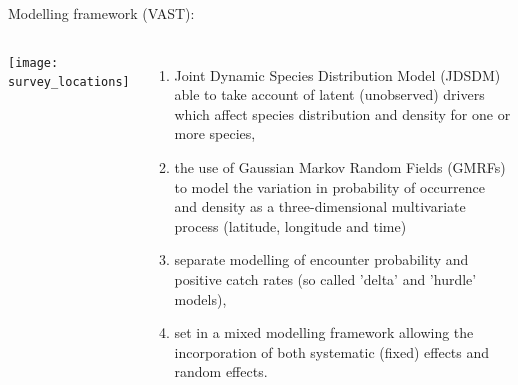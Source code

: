 \documentclass[xcolor=x11names,compress]{beamer}
\renewcommand{\(}{\begin{columns}}
\renewcommand{\)}{\end{columns}}
\newcommand{\<}[1]{\begin{column}{#1}}
\renewcommand{\>}{\end{column}}
\begin{document}
\begin{frame}

Modelling framework (VAST):

\begin{columns}

	\column{0.2\paperwidth}
	
	\texttt{[image: survey\_locations]}

	\column{0.8\paperwidth}
\pause

\begin{enumerate}
	\small
	\setlength\itemsep{1em}

	\item Joint Dynamic Species Distribution Model (JDSDM) able to take
		account of latent (unobserved) drivers which affect species
		distribution and density for one or more species, \pause
	\item the use of Gaussian Markov Random Fields (GMRFs) to model the
		variation in probability of occurrence and density as a
		three-dimensional multivariate process (latitude, longitude and
		time) \pause
	\item separate modelling of encounter probability and positive catch
		rates (so called 'delta' and 'hurdle' models),  \pause
	\item set in a mixed modelling framework allowing the incorporation of
		both systematic (fixed) effects and random effects. 
	
\end{enumerate}

\end{columns}

\end{frame}



	


	



\end{document}
